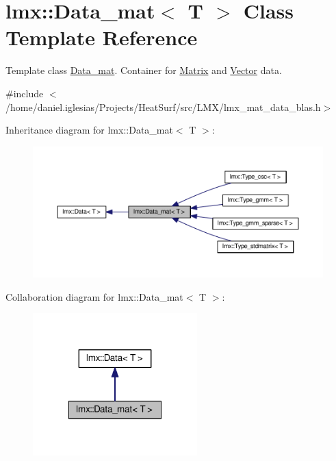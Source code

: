 \hypertarget{classlmx_1_1Data__mat}{\section{lmx\-:\-:Data\-\_\-mat$<$ T $>$ Class Template Reference}
\label{classlmx_1_1Data__mat}
}


Template class \hyperlink{classlmx_1_1Data__mat}{Data\-\_\-mat}. Container for \hyperlink{classlmx_1_1Matrix}{Matrix} and \hyperlink{classlmx_1_1Vector}{Vector} data.  




{\ttfamily \#include $<$/home/daniel.\-iglesias/\-Projects/\-Heat\-Surf/src/\-L\-M\-X/lmx\-\_\-mat\-\_\-data\-\_\-blas.\-h$>$}



Inheritance diagram for lmx\-:\-:Data\-\_\-mat$<$ T $>$\-:
\nopagebreak
\begin{figure}[H]
\begin{center}
\leavevmode
\includegraphics[width=350pt]{classlmx_1_1Data__mat__inherit__graph}
\end{center}
\end{figure}


Collaboration diagram for lmx\-:\-:Data\-\_\-mat$<$ T $>$\-:
\nopagebreak
\begin{figure}[H]
\begin{center}
\leavevmode
\includegraphics[width=180pt]{classlmx_1_1Data__mat__coll__graph}
\end{center}
\end{figure}
